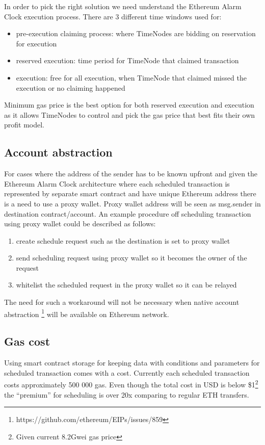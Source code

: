 \documentclass{report}
\begin{document}
  In order to pick the right solution we need understand the Ethereum Alarm Clock execution process. There are 3 different time windows used for:
  \begin{itemize}
    \item pre-execution claiming process: where TimeNodes are bidding on reservation for execution
    \item reserved execution: time period for TimeNode that claimed transaction
    \item execution: free for all execution, when TimeNode that claimed missed the execution or no claiming happened
  \end{itemize}
  Minimum gas price is the best option for both reserved execution and execution as it allows TimeNodes to control and pick the gas price that best fits their own profit model.

  \subsection{Account abstraction}
  For cases where the address of the sender has to be known upfront and given the Ethereum Alarm Clock architecture where each scheduled transaction is represented by separate smart contract and have unique Ethereum address there is a need to use a proxy wallet.
  Proxy wallet address will be seen as msg.sender in destination contract/account. An example procedure off scheduling transaction using proxy wallet could be described as follows:
  \begin{enumerate}
    \item create schedule request such as the destination is set to proxy wallet
    \item send scheduling request using proxy wallet so it becomes the owner of the request
    \item whitelist the scheduled request in the proxy wallet so it can be relayed
  \end{enumerate}

  The need for such a workaround will not be necessary when native account abstraction \footnote{https://github.com/ethereum/EIPs/issues/859} will be available on Ethereum network.

  \subsection{Gas cost}
  Using smart contract storage for keeping data with conditions and parameters for scheduled transaction comes with a cost. Currently each scheduled transaction costs approximately 500 000 gas. Even though the total cost in USD is below \$1\footnote{Given current 8.2Gwei gas price} the “premium” for scheduling is over 20x comparing to regular ETH transfers.
\end{document}
